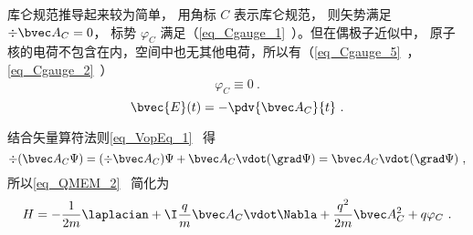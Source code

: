 
\begin{issues}
\issueDraft
\end{issues}


库仑规范推导起来较为简单， 用角标 $C$ 表示库仑规范， 则矢势满足 $\div \bvec A_C = 0$， 标势 $\varphi_C$ 满足（\autoref{eq_Cgauge_1}~）。但在偶极子近似中， 原子核的电荷不包含在内，空间中也无其他电荷，所以有（\autoref{eq_Cgauge_5}~，\autoref{eq_Cgauge_2}~）
\begin{equation}
\varphi_C \equiv 0~.
\end{equation}
\begin{equation}
\bvec {E}(t) = -\pdv{\bvec A_C}{t}~.
\end{equation}

结合矢量算符法则\autoref{eq_VopEq_1}~ 得
\begin{equation}
\div (\bvec A_C \Psi) = (\div \bvec A_C) \Psi + \bvec A_C \vdot (\grad \Psi) = \bvec A_C \vdot (\grad \Psi)~,
\end{equation}
所以\autoref{eq_QMEM_2}~ 简化为
\begin{equation}\label{eq_CouGau_4}
H = -\frac{1}{2m} \laplacian + \I \frac{q}{m} \bvec A_C \vdot \Nabla + \frac{q^2}{2m} \bvec A_C^2 + q\varphi_C~.
\end{equation}
